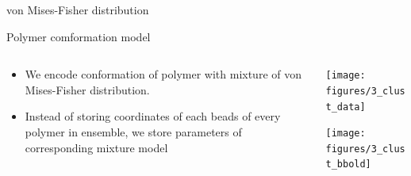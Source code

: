 \documentclass[final,t]{beamer}
\begin{document}
\begin{frame}{}
\begin{columns}[t]
\begin{column}{.3\linewidth}
\begin{block}{von Mises-Fisher distribution}
%            
        \vspace{-2ex}
      \end{block}

      \begin{block}{Polymer comformation model}
        \begin{columns}[T]
          \begin{column}{.5\linewidth}
            \begin{itemize}
            \item We encode conformation of polymer with mixture of von Mises-Fisher distribution. 
	    \item Instead of storing coordinates of each beads of every polymer in ensemble, we store parameters of corresponding mixture model

            \end{itemize}
          \end{column}
          \begin{column}{.5\linewidth}
      \vspace{-5ex}
            \texttt{[image: figures/3\_clust\_data]}
      \vspace{-3ex}

            \texttt{[image: figures/3\_clust\_bbold]}
          \end{column}
        \end{columns}
      \end{block}

    \end{column}

   

\end{columns}
\end{frame}
\end{document}
